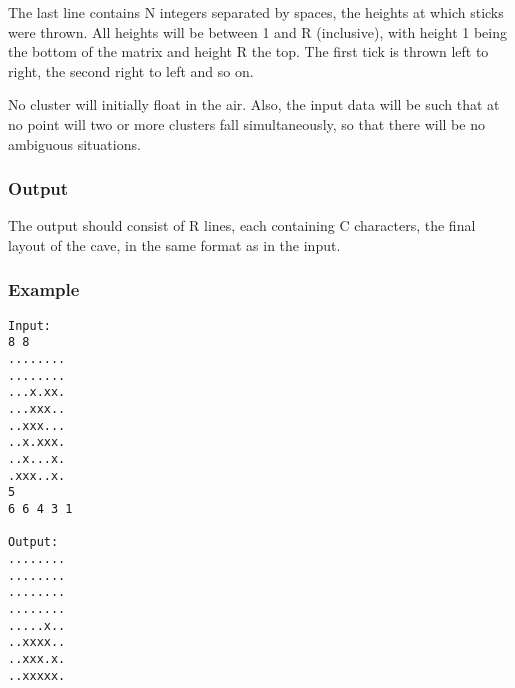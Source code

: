    The last line contains N integers separated by spaces, the heights at which sticks were thrown. All heights will be between 1 and R (inclusive), with height 1 being the bottom of the matrix and height R the top. The first tick is thrown left to right, the second right to left and so on.  

   No cluster will initially float in the air. Also, the input data will be such that at no point will two or more clusters fall simultaneously, so that there will be no ambiguous situations.  

\subsubsection{   Output  }

   The output should consist of R lines, each containing C characters, the final layout of the cave, in the same format as in the input.  

\subsubsection{   Example  }
\begin{verbatim}
Input:
8 8
........
........
...x.xx.
...xxx..
..xxx...
..x.xxx.
..x...x.
.xxx..x.
5
6 6 4 3 1

Output:
........
........
........
........
.....x..
..xxxx..
..xxx.x.
..xxxxx.
\end{verbatim}